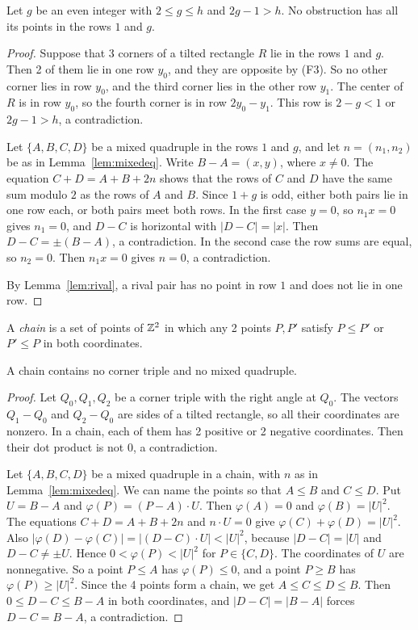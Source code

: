 \begin{lemma}\label{lem:sea}
Let $g$ be an even integer with $2\le g\le h$ and $2g-1>h$. No obstruction has all its
points in the rows $1$ and $g$.
\end{lemma}

\begin{proof}
Suppose that 3 corners of a tilted rectangle $R$ lie in the rows $1$ and $g$. Then 2 of
them lie in one row $y_0$, and they are opposite by (F3). So no other corner lies in row
$y_0$, and the third corner lies in the other row $y_1$. The center of $R$ is in row $y_0$, so the fourth corner is in row
$2y_0-y_1$. This row is $2-g<1$ or $2g-1>h$, a contradiction.

Let $\{A,B,C,D\}$ be a mixed quadruple in the rows $1$ and $g$, and let $n=(n_1,n_2)$ be as
in Lemma~\ref{lem:mixedeq}. Write $B-A=(x,y)$, where $x\ne0$. The equation $C+D=A+B+2n$
shows that the rows of $C$ and $D$ have the same sum modulo $2$ as the rows of $A$ and
$B$. Since $1+g$ is odd, either both pairs lie in one row each, or both pairs meet both
rows. In the first case $y=0$, so $n_1x=0$ gives $n_1=0$, and $D-C$ is horizontal with
$|D-C|=|x|$. Then $D-C=\pm(B-A)$, a contradiction. In the second case the row sums are
equal, so $n_2=0$. Then $n_1x=0$ gives $n=0$, a contradiction.

By Lemma~\ref{lem:rival}, a rival pair has no point in row $1$ and does not lie in one row.
\end{proof}

A \emph{chain} is a set of points of $\mathbb{Z}^2$ in which any 2 points $P,P'$ satisfy $P\le P'$
or $P'\le P$ in both coordinates.

\begin{lemma}[chains]\label{lem:chain}
A chain contains no corner triple and no mixed quadruple.
\end{lemma}

\begin{proof}
Let $Q_0,Q_1,Q_2$ be a corner triple with the right angle at $Q_0$. The vectors $Q_1-Q_0$
and $Q_2-Q_0$ are sides of a tilted rectangle, so all their coordinates are nonzero. In a
chain, each of them has 2 positive or 2 negative coordinates. Then their dot product is not
$0$, a contradiction.

Let $\{A,B,C,D\}$ be a mixed quadruple in a chain, with $n$ as in
Lemma~\ref{lem:mixedeq}. We can name the points so that $A\le B$ and $C\le D$. Put
$U=B-A$ and $\varphi(P)=(P-A)\cdot U$. Then $\varphi(A)=0$ and $\varphi(B)=|U|^2$. The
equations $C+D=A+B+2n$ and $n\cdot U=0$ give $\varphi(C)+\varphi(D)=|U|^2$. Also
$|\varphi(D)-\varphi(C)|=|(D-C)\cdot U|<|U|^2$, because $|D-C|=|U|$ and $D-C\ne\pm U$.
Hence $0<\varphi(P)<|U|^2$ for $P\in\{C,D\}$. The coordinates of $U$ are nonnegative. So a
point $P\le A$ has $\varphi(P)\le0$, and a point $P\ge B$ has $\varphi(P)\ge|U|^2$. Since
the 4 points form a chain, we get $A\le C\le D\le B$. Then $0\le D-C\le B-A$ in both
coordinates, and $|D-C|=|B-A|$ forces $D-C=B-A$, a contradiction.
\end{proof}

